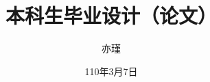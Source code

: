 \documentclass[twoside]{ctexart}
\title{本科生毕业设计（论文）} %
\author{亦瑾}
\institute{计算机与大数据学院}
\date{110年3月7日} %
\begin{document}
\raggedbottom %
% 
\maketitle

% 













\end{document}
